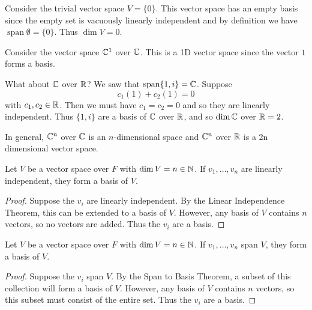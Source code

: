 \documentclass{article}
\DeclareMathOperator{\spn}{span}
\begin{document}
  \begin{example}
    Consider the trivial vector space $V = \{0\}$. This vector space has an empty basis since the empty set is vacuously linearly independent and by definition we have $\spn \emptyset = \{0\}$. Thus $\dim V = 0$.
  \end{example}
  \begin{example}
    Consider the vector space $\mathbb{C}^1$ over $\mathbb{C}$. This is a 1D vector space since the vector $1$ forms a basis.

    What about $\mathbb{C}$ over $\mathbb{R}$?
    We saw that $\spn \{1, i\} = \C$. Suppose \[
      c_1(1) + c_2(1) = 0
    \]
    with $c_1, c_2 \in \mathbb{R}$. Then we must have $c_1 = c_2 = 0$ and so they are linearly independent. Thus $\{1, i\}$ are a basis of $\mathbb{C}$ over $\mathbb{R}$, and so $\dim \mathbb{C}$ over $\mathbb{R} = 2$.

    In general, $\mathbb{C}^n$ over $\mathbb{C}$ is an $n$-dimensional space and $\mathbb{C}^n$ over $\mathbb{R}$ is a 2n dimensional vector space.
  \end{example}
  \begin{theorem}
    Let $V$ be a vector space over $F$ with $\dim V = n \in \mathbb{N}$. If $v_1, \ldots, v_n$ are linearly independent, they form a basis of $V$.
  \end{theorem}
  \begin{proof}
    Suppose the $v_i$ are linearly independent. By the Linear Independence Theorem, this can be extended to a basis of $V$. However, any basis of $V$ contains $n$ vectors, so no vectors are added. Thus the $v_i$ are a basis.
  \end{proof}
  \begin{theorem}
    Let $V$ be a vector space over $F$ with $\dim V = n \in \mathbb{N}$. If $v_1, \ldots, v_n$ span $V$, they form a basis of $V$.
  \end{theorem}
  \begin{proof}
    Suppose the $v_i$ span $V$. By the Span to Basis Theorem, a subset of this collection will form a basis of $V$. However, any basis of $V$ contains $n$ vectors, so this subset must consist of the entire set. Thus the $v_i$ are a basis.
  \end{proof}
\end{document}
